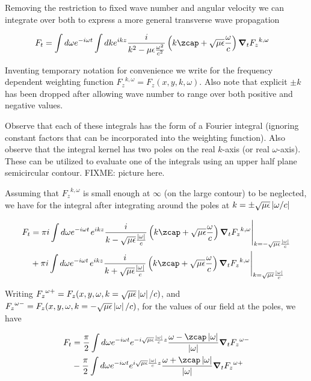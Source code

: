 Removing the restriction to fixed wave number and angular velocity we can integrate over both to express a more general transverse wave propagation

\begin{align}\label{eqn:waveguideRetardedAdvanced:foo8}
F_t &= \int d\omega e^{-i\omega t} \int dk e^{ikz} \frac{i}{k^2 - \mu\epsilon\frac{\omega^2}{c^2}} \left(k \zcap + \sqrt{\mu\epsilon}\frac{\omega}{c}\right) \spacegrad_t {F_z}^{k,\omega}
\end{align}

Inventing temporary notation for convenience we write for the frequency dependent weighting function ${F_z}^{k,\omega} = F_z(x,y,k,\omega)$.  Also note that explicit $\pm k$ has been dropped after allowing wave number to range over both positive and negative values.

Observe that each of these integrals has the form of a Fourier integral (ignoring constant factors that can be incorporated into the weighting function).  Also observe that the integral kernel has two poles on the real $k$-axis (or real $\omega$-axis).  These can be utilized to evaluate one of the integrals using an upper half plane semicircular contour.  FIXME: picture here.

Assuming that ${F_z}^{k,\omega}$ is small enough at $\infty$ (on the large contour) to be neglected, we have for the integral after integrating around the poles at $k = \pm \sqrt{\mu\epsilon}\left\lvert{\omega/c}\right\rvert$

\begin{align*} %
F_t 
&= 
\pi i 
\int d\omega e^{-i\omega t} 
{\left.
e^{ikz} \frac{i}{k - \sqrt{\mu\epsilon}\frac{\Abs{\omega}}{c}} \left(k \zcap + \sqrt{\mu\epsilon}\frac{\omega}{c}\right) \spacegrad_t {F_z}^{k,\omega}
\right\vert}_{k=-\sqrt{\mu\epsilon}\frac{\Abs{\omega}}{c}} \\
&+ 
\pi i 
\int d\omega e^{-i\omega t} 
{\left.
e^{ikz} \frac{i}{k + \sqrt{\mu\epsilon}\frac{\Abs{\omega}}{c}} \left(k \zcap + \sqrt{\mu\epsilon}\frac{\omega}{c}\right) \spacegrad_t {F_z}^{k,\omega}
\right\vert}_{k=\sqrt{\mu\epsilon}\frac{\Abs{\omega}}{c}}
\end{align*}

Writing ${F_z}^{\omega+} = F_z(x,y,\omega, k=\sqrt{\mu\epsilon}\left\lvert{\omega}\right\rvert/c)$, and ${F_z}^{\omega-} = F_z(x,y,\omega, k=-\sqrt{\mu\epsilon}\left\lvert{\omega}\right\rvert/c)$, for the values of our field at the poles, we have

\begin{align*} %
F_t 
&= 
\frac{\pi}{2}
\int d\omega e^{-i\omega t} 
e^{-i \sqrt{\mu\epsilon}\frac{\Abs{\omega}}{c} z}
\frac{\omega -\zcap\Abs{\omega}}{\Abs{\omega}}
\spacegrad_t {F_z}^{\omega-} \\
&
- 
\frac{\pi}{2}
\int d\omega e^{-i\omega t} 
e^{i \sqrt{\mu\epsilon}\frac{\Abs{\omega}}{c} z} 
\frac{\omega +\zcap\Abs{\omega}}{\Abs{\omega}}
\spacegrad_t {F_z}^{\omega+}
\end{align*}

\EndArticle
